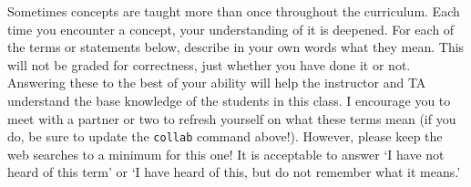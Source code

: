 \documentclass{article}
\begin{document}
\collab{\todo{}}

Sometimes concepts are taught more than once throughout the curriculum.  Each
time you encounter a concept, your understanding of it is deepened.
For each of the terms or statements below, describe in your own words what they
mean.  This will not be graded for correctness, just whether you have done it or
not.  Answering these to the best of your ability will help the instructor and
TA understand the base knowledge of the students in this class.
I encourage you to meet with a partner or two to refresh yourself on what these
terms mean (if you do, be sure to update the \texttt{collab} command
above!).  However, please keep the web searches to a minimum for this one!  It
is acceptable to answer `I have not heard of this term' or `I have heard of
this, but do not remember what it means.'
\end{document}
